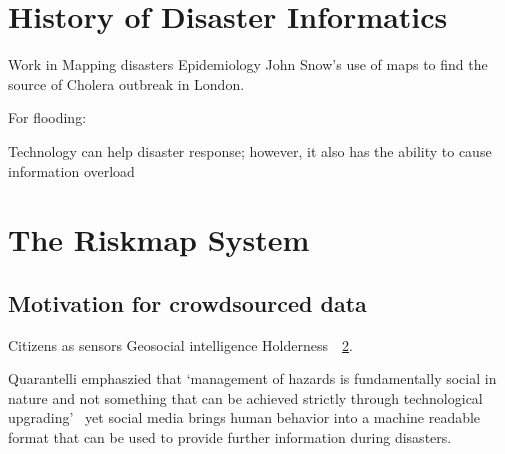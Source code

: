 \section{History of Disaster Informatics}
Work in Mapping disasters
Epidemiology John Snow's use of maps to find the source of Cholera outbreak in
London\cite{rogersJohnSnowData2013}.

For flooding:~\cite{ahernGlobalHealthImpacts2005}

Technology can help disaster response; however, it also has the ability to cause
information overload\cite{tierneyFacingUnexpectedDisaster2001}



\section{The Riskmap System}\label{ch1:riskmap}


\subsection{Motivation for crowdsourced data}
Citizens as sensors
Geosocial intelligence
Holderness~\cite{holdernessSocialMediaGeoSocial2015a}~\ref{ch1:riskmap}.

Quarantelli emphaszied that  `management of hazards is fundamentally social in
nature and not something that can be achieved strictly through technological
upgrading'~\cite{tierneyFacingUnexpectedDisaster2001} yet social media brings
human behavior into a machine readable format that can be used to provide
further information during disasters.


\subsection{}

